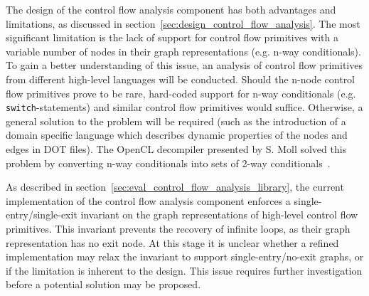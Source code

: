 The design of the control flow analysis component has both advantages and limitations, as discussed in section~\ref{sec:design_control_flow_analysis}. The most significant limitation is the lack of support for control flow primitives with a variable number of nodes in their graph representations (e.g. n-way conditionals). To gain a better understanding of this issue, an analysis of control flow primitives from different high-level languages will be conducted. Should the n-node control flow primitives prove to be rare, hard-coded support for n-way conditionals (e.g. \texttt{switch}-statements) and similar control flow primitives would suffice. Otherwise, a general solution to the problem will be required (such as the introduction of a domain specific language which describes dynamic properties of the nodes and edges in DOT files). The OpenCL decompiler presented by S. Moll solved this problem by converting n-way conditionals into sets of 2-way conditionals~\cite{decomp_of_llvm}.

As described in section~\ref{sec:eval_control_flow_analysis_library}, the current implementation of the control flow analysis component enforces a single-entry/single-exit invariant on the graph representations of high-level control flow primitives. This invariant prevents the recovery of infinite loops, as their graph representation has no exit node. At this stage it is unclear whether a refined implementation may relax the invariant to support single-entry/no-exit graphs, or if the limitation is inherent to the design. This issue requires further investigation before a potential solution may be proposed.
